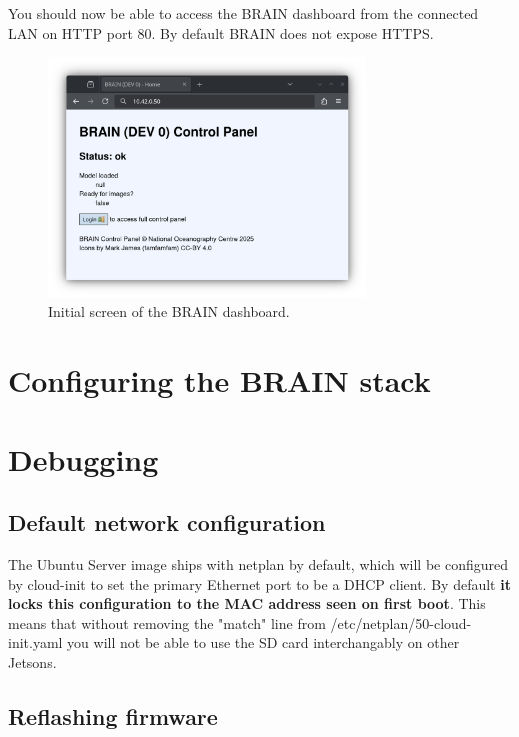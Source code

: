 \documentclass[11pt]{article}
\begin{document}
You should now be able to access the BRAIN dashboard from the connected LAN on HTTP port 80. By default BRAIN does not expose HTTPS.

\begin{figure}[h!]
\centering
\includegraphics[width=0.75\textwidth]{brain-cpanel}
\caption{Initial screen of the BRAIN dashboard.}
\end{figure}

\newpage

\section{Configuring the BRAIN stack}

\newpage

\section{Debugging}

\subsection{Default network configuration}
\label{sec:debug-network_config}

The Ubuntu Server image ships with netplan by default, which will be configured by cloud-init to set the primary Ethernet port to be a DHCP client. By default \textbf{it locks this configuration to the MAC address seen on first boot}. This means that without removing the "match" line from /etc/netplan/50-cloud-init.yaml you will not be able to use the SD card interchangably on other Jetsons.

\subsection{Reflashing firmware}
\label{sec:debug-reflash_firmware}
\end{document}
